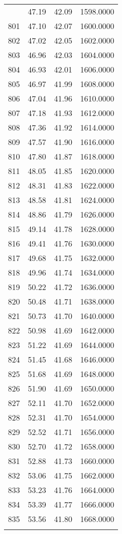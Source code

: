 \documentclass[
  captions=tableheading,
]{scrartcl}
\begin{document}
\begin{longtable} {l|l|l|l}
{800 &	47.19 &	42.09 &	1598.0000\\
801 &	47.10 &	42.07 &	1600.0000\\
802 &	47.02 &	42.05 &	1602.0000\\
803 &	46.96 &	42.03 &	1604.0000\\
804 &	46.93 &	42.01 &	1606.0000\\
805 &	46.97 &	41.99 &	1608.0000\\
806 &	47.04 &	41.96 &	1610.0000\\
807 &	47.18 &	41.93 &	1612.0000\\
808 &	47.36 &	41.92 &	1614.0000\\
809 &	47.57 &	41.90 &	1616.0000\\
810 &	47.80 &	41.87 &	1618.0000\\
811 &	48.05 &	41.85 &	1620.0000\\
812 &	48.31 &	41.83 &	1622.0000\\
813 &	48.58 &	41.81 &	1624.0000\\
814 &	48.86 &	41.79 &	1626.0000\\
815 &	49.14 &	41.78 &	1628.0000\\
816 &	49.41 &	41.76 &	1630.0000\\
817 &	49.68 &	41.75 &	1632.0000\\
818 &	49.96 &	41.74 &	1634.0000\\
819 &	50.22 &	41.72 &	1636.0000\\
820 &	50.48 &	41.71 &	1638.0000\\
821 &	50.73 &	41.70 &	1640.0000\\
822 &	50.98 &	41.69 &	1642.0000\\
823 &	51.22 &	41.69 &	1644.0000\\
824 &	51.45 &	41.68 &	1646.0000\\
825 &	51.68 &	41.69 &	1648.0000\\
826 &	51.90 &	41.69 &	1650.0000\\
827 &	52.11 &	41.70 &	1652.0000\\
828 &	52.31 &	41.70 &	1654.0000\\
829 &	52.52 &	41.71 &	1656.0000\\
830 &	52.70 &	41.72 &	1658.0000\\
831 &	52.88 &	41.73 &	1660.0000\\
832 &	53.06 &	41.75 &	1662.0000\\
833 &	53.23 &	41.76 &	1664.0000\\
834 &	53.39 &	41.77 &	1666.0000\\
835 &	53.56 &	41.80 &	1668.0000\\
}
\end{longtable}
\end{document}
